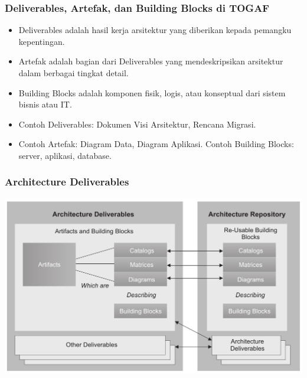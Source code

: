 \documentclass[aspectratio=169]{beamer}
\begin{document}
	
	
	\begin{frame}
		\frametitle{Deliverables, Artefak, dan Building Blocks di TOGAF}
		\begin{itemize}
			\item Deliverables adalah hasil kerja arsitektur yang diberikan kepada pemangku kepentingan.
			\item Artefak adalah bagian dari Deliverables yang mendeskripsikan arsitektur dalam berbagai tingkat detail.
			\item Building Blocks adalah komponen fisik, logis, atau konseptual dari sistem bisnis atau IT.
			\item Contoh Deliverables: Dokumen Visi Arsitektur, Rencana Migrasi.
			\item Contoh Artefak: Diagram Data, Diagram Aplikasi. Contoh Building Blocks: server, aplikasi, database.
		\end{itemize}
	\end{frame}
	
	{
		\begin{frame}
			\frametitle{Architecture Deliverables}
			\begin{center}
				\includegraphics[width=.95\textwidth]{../figures/architecture_deliverables}
			\end{center}
		\end{frame}
	}
	
	
	
\end{document}
